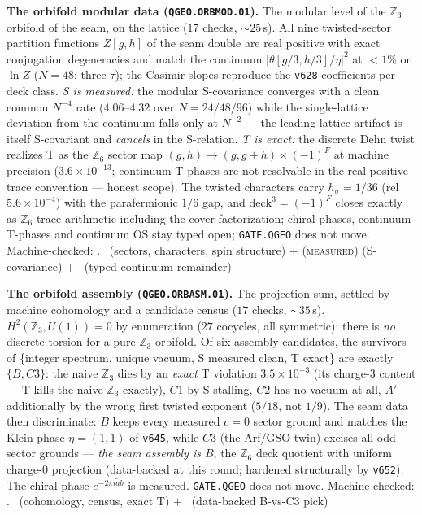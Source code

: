 \documentclass[11pt,a4paper]{article}
\theoremstyle{definition}
\begin{document}
\par\smallskip\noindent\textbf{The orbifold modular data
(\texttt{QGEO.ORBMOD.01}).}
The modular level of the $\mathbb{Z}_3$ orbifold of the seam, on the
lattice ($17$ checks, ${\sim}25$\,s).  All nine twisted-sector
partition functions $Z[g,h]$ of the seam double are real positive
with exact conjugation degeneracies and match the continuum
$|\theta[g/3,h/3]/\eta|^2$ at $<1\%$ on $\ln Z$ ($N=48$; three
$\tau$); the Casimir slopes reproduce the \texttt{v628} coefficients
per deck class.  \emph{S is measured:} the modular S-covariance
converges with a clean common $N^{-4}$ rate ($4.06$--$4.32$ over
$N=24/48/96$) while the single-lattice deviation from the continuum
falls only at $N^{-2}$ --- the leading lattice artifact is itself
S-covariant and \emph{cancels} in the S-relation.  \emph{T is exact:}
the discrete Dehn twist realizes T as the $\mathbb{Z}_6$ sector map
$(g,h)\to(g,g{+}h)\times(-1)^F$ at machine precision
($3.6\times10^{-13}$; continuum T-phases are not resolvable in the
real-positive trace convention --- honest scope).  The twisted
characters carry $h_\sigma=1/36$ (rel $5.6\times10^{-4}$) with the
parafermionic $1/6$ gap, and $\mathrm{deck}^3=(-1)^F$ closes exactly
as $\mathbb{Z}_6$ trace arithmetic including the cover factorization;
chiral phases, continuum T-phases and continuum OS stay typed open;
\texttt{GATE.QGEO} does not move.
Machine-checked: .
\mE\ (sectors, characters, spin structure) $+$ (\textsc{measured})
(S-covariance) $+$ \mC\ (typed continuum remainder)
\par\smallskip

\par\smallskip\noindent\textbf{The orbifold assembly
(\texttt{QGEO.ORBASM.01}).}
The projection sum, settled by machine cohomology and a candidate
census ($17$ checks, ${\sim}35$\,s).  $H^2(\mathbb{Z}_3,U(1))=0$ by
enumeration ($27$ cocycles, all symmetric): there is \emph{no}
discrete torsion for a pure $\mathbb{Z}_3$ orbifold.  Of six assembly
candidates, the survivors of \{integer spectrum, unique vacuum, S
measured clean, T exact\} are exactly $\{B, C3\}$: the naive
$\mathbb{Z}_3$ dies by an \emph{exact} T violation $3.5\times10^{-3}$
(its charge-$3$ content --- T kills the naive $\mathbb{Z}_3$
exactly), $C1$ by S stalling, $C2$ has no vacuum at all, $A'$
additionally by the wrong first twisted exponent ($5/18$, not
$1/9$).  The seam data then discriminate: $B$ keeps every measured
$c=0$ sector ground and matches the Klein phase $\eta=(1,1)$ of
\texttt{v645}, while $C3$ (the Arf/GSO twin) excises all odd-sector
grounds --- \emph{the seam assembly is $B$}, the $\mathbb{Z}_6$ deck
quotient with uniform charge-$0$ projection (data-backed at this
round; hardened structurally by \texttt{v652}).  The chiral phase
$e^{-2\pi i\tilde a b}$ is measured.  \texttt{GATE.QGEO} does not
move.
Machine-checked: .
\mE\ (cohomology, census, exact T) $+$ \mC\ (data-backed B-vs-C3
pick)
\par\smallskip
\end{document}

